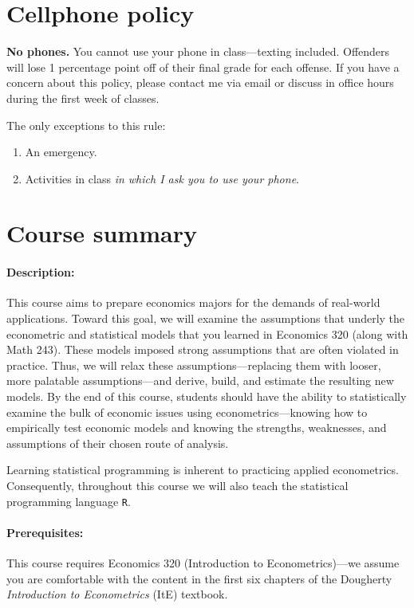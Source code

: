 \documentclass[10pt]{article}
\begin{document}
\section*{Cellphone policy}

\textbf{No phones.} You cannot use your phone in class---texting included. Offenders will lose 1 percentage point off of their final grade for each offense. If you have a concern about this policy, please contact me via email or discuss in office hours during the first week of classes.

\bigskip \noindent The only exceptions to this rule:
\begin{enumerate}
  \item An emergency.
  \item Activities in class \textit{in which I ask you to use your phone}.
\end{enumerate}

\section*{Course summary}

\paragraph{Description:} This course aims to prepare economics majors for the demands of real-world applications. Toward this goal, we will examine the assumptions that underly the econometric and statistical models that you learned in Economics 320 (along with Math 243). These models imposed strong assumptions that are often violated in practice. Thus, we will relax these assumptions---replacing them with looser, more palatable assumptions---and derive, build, and estimate the resulting new models. By the end of this course, students should have the ability to statistically examine the bulk of economic issues using econometrics---knowing how to empirically test economic models and knowing the strengths, weaknesses, and assumptions of their chosen route of analysis.

Learning statistical programming is inherent to practicing applied econometrics. Consequently, throughout this course we will also teach the statistical programming language \texttt{{R}}.

\paragraph{Prerequisites:} This course requires Economics 320 (Introduction to Econometrics)---we assume you are comfortable with the content in the first six chapters of the Dougherty \textit{Introduction to Econometrics} (ItE) textbook.
\end{document}

